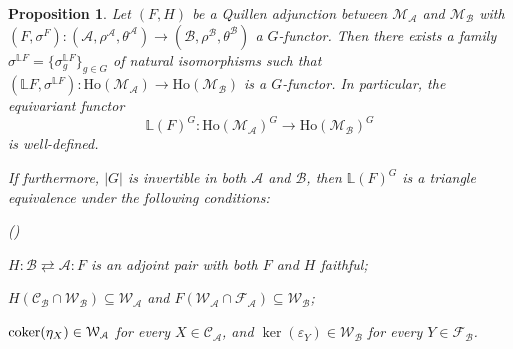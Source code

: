 \documentclass[12pt,twoside]{amsart}
\theoremstyle{bfupright head,slanted body}
\theoremstyle{bfupright head,upright body}
\theoremstyle{fixed bf head,slanted body}
\newtheorem{prp}[res]{Proposition}      \newtheorem*{prp*}{Proposition}
\theoremstyle{fixed bf head,upright body}
\theoremstyle{numbered paragraph}
\newlength{\thmlistleft}        %
\newlength{\thmlistright}       %
\newlength{\thmlistpartopsep}   %
\newlength{\thmlisttopsep}      %
\newlength{\thmlistparsep}      %
\newlength{\thmlistitemsep}     %
\newcounter{prt}
\newenvironment{prt}{\begin{list}{\upshape (\alph{prt})}%
    {\usecounter{prt}%
      \setlength{\leftmargin}{\thmlistleft}%
      \setlength{\labelwidth}{\thmlistleft}%
      \setlength{\rightmargin}{\thmlistright}%
      \setlength{\partopsep}{\thmlistpartopsep}%
      \setlength{\topsep}{\thmlisttopsep}%
      \setlength{\parsep}{\thmlistparsep}%
      \setlength{\itemsep}{\thmlistitemsep}}}%
  {\end{list}}%
\numberwithin{equation}{res}
\newcommand{\coker}{\mbox{\rm coker}}
\newcommand{\calC}{\mathcal{C}}
\newcommand{\calW}{\mathcal{W}}
\newcommand{\calF}{\mathcal{F}}
\newcommand{\calA}{\mathcal{A}}
\newcommand{\calB}{\mathcal{B}}
\newcommand{\calM}{\mathcal{M}}
\newcommand{\Ho}{\mathrm{Ho}}
\begin{document}
\begin{prp} \label{G-functor for LF}
Let $(F, H)$ be a Quillen adjunction between $\calM_\calA$ and $\calM_\calB$ with $(F, \sigma^F): (\calA, \rho^\calA, \theta^\calA) \to (\calB, \rho^\calB, \theta^\calB)$ a $G$-functor.
Then there exists a family $\sigma^{\mathbb{L}F}=\{\sigma_g^{\mathbb{L}F} \}_{g \in G}$ of natural isomorphisms such that
$(\mathbb{L}F, \sigma^{\mathbb{L}F}): \Ho(\calM_\calA) \to \Ho(\calM_\calB)$ is a $G$-functor.
In particular, the equivariant functor
\[
\mathbb{L}(F)^G:\Ho(\calM_\calA)^G \longrightarrow \Ho(\calM_\calB)^G
\]
is well-defined.

If furthermore, \(|G|\) is invertible in both \(\calA\) and \(\calB\), then \(\mathbb{L}(F)^G\) is a triangle equivalence under the following conditions:
\begin{prt}
\item $H : \calB \rightleftarrows \calA : F$ is an adjoint pair with both \(F\) and \(H\) faithful;
\item \(H(\calC_\calB\cap\calW_\calB)\subseteq\calW_\calA\) and \(F(\calW_\calA\cap\calF_\calA)\subseteq\calW_\calB\);
\item \(\coker(\eta_X)\in\calW_\calA\) for every \(X\in\calC_\calA\), and \(\ker(\varepsilon_Y)\in\calW_\calB\) for every \(Y\in\calF_\calB\).
\end{prt}

\end{prp}
\end{document}
